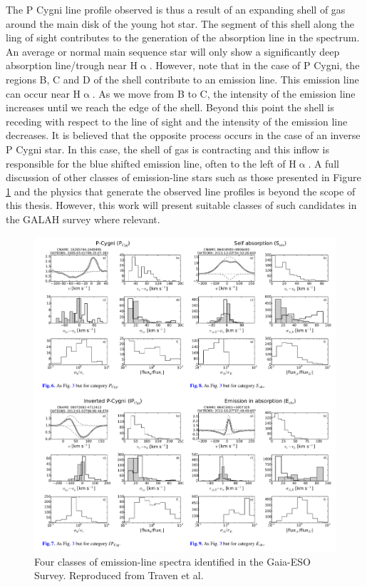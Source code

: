 The P Cygni line profile observed is thus a result of an expanding shell of gas around the main disk of the young hot star. The segment of this shell along the ling of sight contributes to the generation of the absorption line in the spectrum. An average or normal main sequence star will only show a significantly deep absorption line/trough near H$\upalpha$. However, note that in the case of P Cygni, the regions B, C and D of the shell contribute to an emission line. This emission line can occur near H$\upalpha$. As we move from B to C, the intensity of the emission line increases until we reach the edge of the shell. Beyond this point the shell is receding with respect to the line of sight and the intensity of the emission line decreases. It is believed that the opposite process occurs in the case of an inverse P Cygni star. In this case, the shell of gas is contracting and this inflow is responsible for the blue shifted emission line, often to the left of H$\upalpha$. A full discussion of other classes of emission-line stars such as those presented in Figure \ref{fig1.3} and the physics that generate the observed line profiles is beyond the scope of this thesis. However, this work will present suitable classes of such candidates in the GALAH survey where relevant.

\begin{figure}[!htb]
\centering
\includegraphics[scale=.48]{figures/p cygni and inverse p cygni.png}
\caption{Four classes of emission-line spectra identified in the Gaia-ESO Survey. Reproduced from Traven et al.\cite{traven2015gaia}}
\label{fig1.3}
\end{figure}

